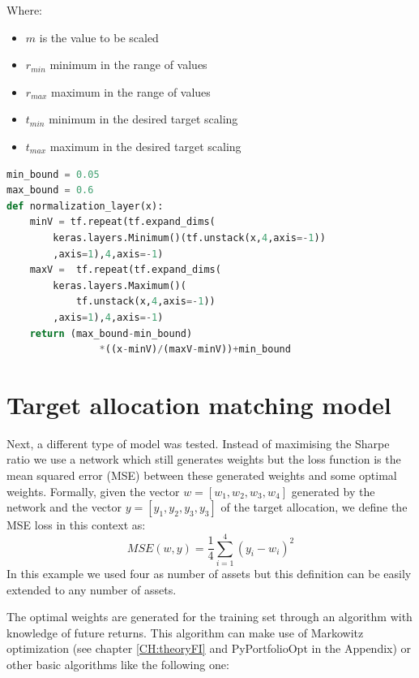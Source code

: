 \begin{minipage}{\textwidth}
Where:
\begin{itemize}
    \item $m$ is the value to be scaled
    \item $r_{min}$ minimum in the range of values
    \item $r_{max}$ maximum in the range of values
    \item $t_{min}$ minimum in the desired target scaling
    \item $t_{max}$ maximum in the desired target scaling
\end{itemize}
\end{minipage}




\begin{minipage}{\linewidth}
\begin{lstlisting}[language=Python, caption=Keras layer to force the weights to be between 5\% and 60\%, label=lst:normalization_layer, frame = single]
min_bound = 0.05
max_bound = 0.6
def normalization_layer(x):
    minV = tf.repeat(tf.expand_dims(
        keras.layers.Minimum()(tf.unstack(x,4,axis=-1))
        ,axis=1),4,axis=-1)
    maxV =  tf.repeat(tf.expand_dims(
        keras.layers.Maximum()(
            tf.unstack(x,4,axis=-1))
        ,axis=1),4,axis=-1)
    return (max_bound-min_bound)
                *((x-minV)/(maxV-minV))+min_bound
\end{lstlisting}
\end{minipage}


\section{Target allocation matching model}
\label{s:target_allocation_model}

Next, a different type of model was tested. Instead of maximising the Sharpe ratio we use a network which still generates weights but the loss function is the mean squared error (MSE) between these generated weights and some optimal weights.
Formally, given the vector $w = [w_1, w_2, w_3, w_4]$ generated by the network and the vector $y= [y_1, y_2, y_3, y_3]$ of the target allocation, we define the MSE loss in this context as:
$$ MSE(w,y) = \frac{1}{4} \sum_{i=1}^4 (y_i - w_i)^2  $$
In this example we used four as number of assets but this definition can be easily extended to any number of assets.

\hfill \break

The optimal weights are generated for the training set through an algorithm with knowledge of future returns. This algorithm can make use of Markowitz optimization (see chapter \ref{CH:theoryFI} and PyPortfolioOpt in the Appendix) or other basic algorithms like the following one:

